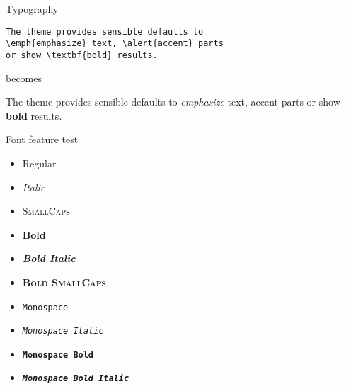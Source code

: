 \documentclass[10pt]{beamer}
\begin{document}
\begin{frame}[fragile]{Typography}
      \begin{verbatim}The theme provides sensible defaults to
\emph{emphasize} text, \alert{accent} parts
or show \textbf{bold} results.\end{verbatim}

  \begin{center}becomes\end{center}

  The theme provides sensible defaults to \emph{emphasize} text,
  \alert{accent} parts or show \textbf{bold} results.
\end{frame}

\begin{frame}{Font feature test}
  \begin{itemize}
    \item Regular
    \item \textit{Italic}
    \item \textsc{SmallCaps}
    \item \textbf{Bold}
    \item \textbf{\textit{Bold Italic}}
    \item \textbf{\textsc{Bold SmallCaps}}
    \item \texttt{Monospace}
    \item \texttt{\textit{Monospace Italic}}
    \item \texttt{\textbf{Monospace Bold}}
    \item \texttt{\textbf{\textit{Monospace Bold Italic}}}
  \end{itemize}
\end{frame}
\end{document}

